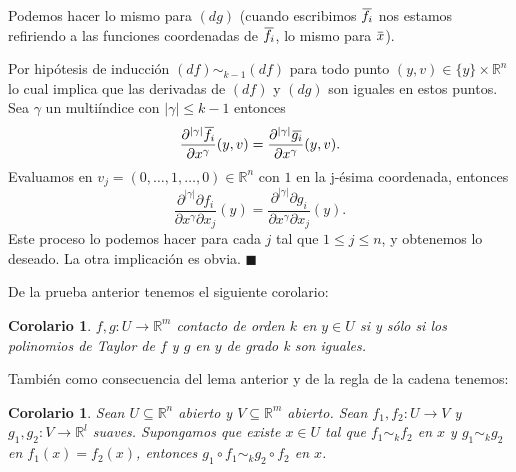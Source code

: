 \documentclass{report}
\newtheorem{coro}[theorem]{Corolario}
\theoremstyle{definition}
\newcommand{\overbar}[1]{\mkern 1.5mu\overline{\mkern-1.5mu#1\mkern-1.5mu}\mkern 1.5mu}
\begin{document}
Podemos hacer lo mismo para $(dg)$ (cuando escribimos $\overbar{f_i}$ nos estamos refiriendo a las funciones coordenadas de $\overbar{f_i}$, lo mismo para $\overbar{x}$).

Por hip\'otesis de inducci\'on $(df) \sim_{k-1} (df)$ para todo punto $(y , v) \in  \{ y \} \times \mathbb{R}^n$ lo cual implica que las derivadas de $(df)$ y $(dg)$ son iguales en estos puntos. Sea $\gamma$ un multi\'indice con $\vert \gamma \vert \leq k-1$ entonces
$$\frac{\partial^{\vert \gamma \vert} \overbar{f_i}}{\partial x^\gamma} (y , v) = \frac{\partial^{\vert \gamma \vert} \overbar{g_i}}{\partial x^\gamma} (y,v) .$$
Evaluamos en $v_j = (0 , \dots , 1 , \dots , 0) \in \mathbb{R}^n$ con $1$ en la j-\'esima coordenada, entonces 
$$\frac{\partial^{\vert \gamma \vert} \partial f_i }{\partial x^\gamma \partial x_j} (y ) = \frac{\partial^{\vert \gamma \vert} \partial g_i}{\partial x^\gamma \partial x_j} (y).$$
Este proceso lo podemos hacer para cada $j$ tal que $1 \leq j \leq n$, y obtenemos lo deseado. La otra implicaci\'on es obvia.
$\blacksquare$

De la prueba anterior tenemos el siguiente corolario:
\begin{coro}
$f,g: U \to \mathbb{R}^m$ contacto de orden $k$ en $y \in U$ si y s\'olo si los polinomios  de Taylor de $f$ y $g$ en $y$ de grado k son iguales.
\end{coro} 

Tambi\'en como consecuencia del lema anterior y de la regla de la cadena tenemos:

\begin{coro}
Sean $U \subseteq \mathbb{R}^n$ abierto y $V\subseteq \mathbb{R}^m$ abierto. Sean $f_1 , f_2 : U \to V$ y $g_1, g_2 : V \to \mathbb{R}^l$ suaves. Supongamos que existe  $x \in U$ tal que $f_1 \sim_k f_2 $ en $x$ y $g_1 \sim_k g_2 $ en $f_1(x) =f_2 (x)$, entonces $g_1 \circ f_1 \sim_k g_2 \circ f_2$ en $x$.
\end{coro}
\end{document}
